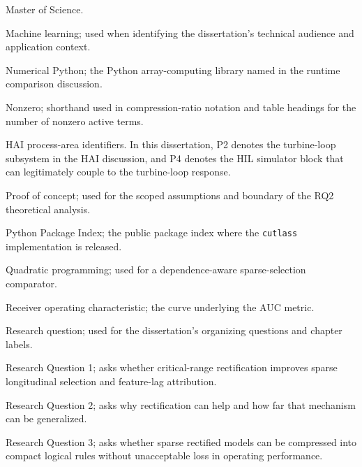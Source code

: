 \begin{description}[style=nextline,leftmargin=0pt,labelsep=0pt]
    \item[M.S.] Master of Science.

    \item[ML] Machine learning; used when identifying the dissertation's technical audience and application context.

    \item[NumPy] Numerical Python; the Python array-computing library named in the runtime comparison discussion.

    \item[nz] Nonzero; shorthand used in compression-ratio notation and table headings for the number of nonzero active terms.

    \item[P1--P4] HAI process-area identifiers. In this dissertation, P2 denotes the turbine-loop subsystem in the HAI discussion, and P4 denotes the HIL simulator block that can legitimately couple to the turbine-loop response.

    \item[PoC] Proof of concept; used for the scoped assumptions and boundary of the RQ2 theoretical analysis.

    \item[PyPI] Python Package Index; the public package index where the \texttt{cutlass} implementation is released.

    \item[QP] Quadratic programming; used for a dependence-aware sparse-selection comparator.

    \item[ROC] Receiver operating characteristic; the curve underlying the AUC metric.

    \item[RQ] Research question; used for the dissertation's organizing questions and chapter labels.

    \item[RQ1] Research Question 1; asks whether critical-range rectification improves sparse longitudinal selection and feature-lag attribution.

    \item[RQ2] Research Question 2; asks why rectification can help and how far that mechanism can be generalized.

    \item[RQ3] Research Question 3; asks whether sparse rectified models can be compressed into compact logical rules without unacceptable loss in operating performance.


\end{description}
